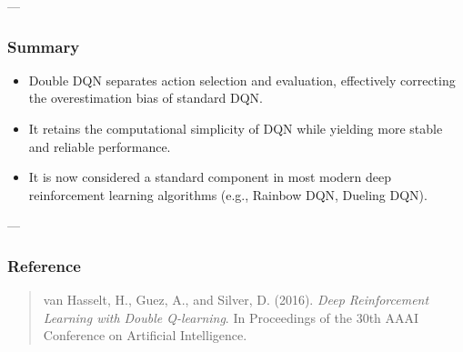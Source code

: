 \documentclass[12pt]{article}
\theoremstyle{definition} %
\theoremstyle{plain} %
\theoremstyle{remark} %
\begin{document}
\begin{CJK}{UTF8}{gbsn}
\begin{table}[h!]
\centering
\renewcommand{\arraystretch}{1.3}
\end{table}

---

\subsubsection*{Summary}

\begin{itemize}
    \item Double DQN separates action selection and evaluation, effectively correcting the overestimation bias of standard DQN.
    \item It retains the computational simplicity of DQN while yielding more stable and reliable performance.
    \item It is now considered a standard component in most modern deep reinforcement learning algorithms (e.g., Rainbow DQN, Dueling DQN).
\end{itemize}

---

\subsubsection*{Reference}

\begin{quote}
van Hasselt, H., Guez, A., and Silver, D. (2016).  
\textit{Deep Reinforcement Learning with Double Q-learning}.  
In Proceedings of the 30th AAAI Conference on Artificial Intelligence.
\end{quote}

\end{CJK}
\end{document}
